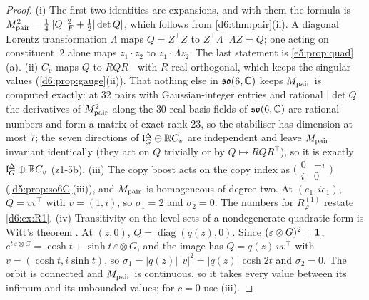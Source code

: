 \begin{proof}
(i) The first two identities are expansions, and with them the formula is $M_{\rm pair}^2=\tfrac14\|Q\|_F^2+\tfrac12|\det Q|$, which follows from
\cref{d6:thm:pair}(ii). A diagonal Lorentz transformation $\Lambda$ maps $Q=Z^{\!\top}Z$ to $Z^{\!\top}\Lambda^{\!\top}\Lambda Z=Q$; one acting on
constituent~$2$ alone maps $z_1\cdot z_2$ to $z_1\cdot\Lambda z_2$. The last statement is \cref{e5:prop:quad}(a). (ii) $C_v$ maps $Q$ to $RQR^{\!\top}$ with
$R$ real orthogonal, which keeps the singular values (\cref{d6:prop:gauge}(ii)). That nothing else in $\mathfrak{so}(6,\mathbb{C})$ keeps $M_{\rm pair}$ is
computed exactly: at $32$ pairs with Gaussian-integer entries and rational $|\det Q|$ the derivatives of $M_{\rm pair}^2$ along the $30$ real basis fields of $\mathfrak{so}(6,\mathbb{C})$ are rational numbers and form a matrix of exact rank $23$, so the stabiliser has dimension at most $7$; the seven directions of $\mathfrak l_G^\Delta\oplus\mathbb{R} C_v$ are independent and leave $M_{\rm pair}$ invariant identically (they act on $Q$ trivially or by $Q\mapsto RQR^{\!\top}$), so it is exactly $\mathfrak l_G^\Delta\oplus\mathbb{R} C_v$ (z1-5b). (iii) The copy
boost acts on the copy index as $\bigl(\begin{smallmatrix}0&-i\\i&0\end{smallmatrix}\bigr)$ (\cref{d5:prop:so6C}(iii)), and $M_{\rm pair}$
is homogeneous of degree two. At $(e_1,ie_1)$, $Q=vv^{\!\top}$ with $v=(1,i)$, so $\sigma_1=2$ and $\sigma_2=0$. The numbers for $R^{(1)}_\varphi$
restate \cref{d6:ex:R1}. (iv) Transitivity on the level sets of a nondegenerate quadratic form is Witt's theorem \cite{Witt37}. At $(z,0)$,
$Q=\operatorname{diag}(q(z),0)$. Since $(\varepsilon\otimes G)^2=\mathbf 1$, $e^{t\,\varepsilon\otimes G}=\cosh t+\sinh t\,\varepsilon\otimes G$, and the image has
$Q=q(z)\,vv^{\!\top}$ with $v=(\cosh t,i\sinh t)$, so $\sigma_1=|q(z)|\,|v|^2=|q(z)|\cosh2t$ and $\sigma_2=0$. The orbit is connected and $M_{\rm pair}$
is continuous, so it takes every value between its infimum and its unbounded values; for $c=0$ use (iii).
\end{proof}

